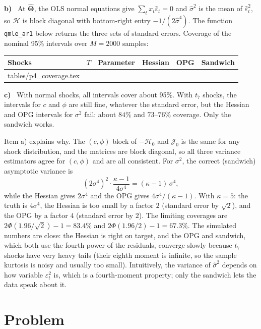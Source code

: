 \documentclass[11pt]{article}
\makeatletter
\newcommand{\symbf}[1]{\boldsymbol{#1}}
\newcounter{problem}
\renewcommand{\theproblem}{\arabic{problem}}
\newcommand{\problem}{
	\stepcounter{problem}
	\section*{Problem \theproblem}
}
\newcommand{\itm}[1]{\par\textbf{#1)}\ }
\newcommand{\tablerows}[1]{\@@input #1 }
\makeatother
\begin{document}
\itm{b}
At $\hat{\symbf\Theta}$, the OLS normal equations give $\sum_tx_t\hat\varepsilon_t=0$ and $\hat\sigma^2$ is the mean of $\hat\varepsilon_t^2$, so $\mathcal H$ is block diagonal with bottom-right entry $-1/(2\hat\sigma^4)$. The function \texttt{qmle\_ar1} below returns the three sets of standard errors. Coverage of the nominal 95\% intervals over $M=2000$ samples:

\begin{table}[H]
	\centering
	\begin{tabular}{llcccc}
		\toprule
		Shocks & $T$ & Parameter & Hessian & OPG & Sandwich \\
		\midrule
		\tablerows{tables/p4_coverage.tex}
		\bottomrule
	\end{tabular}
\end{table}

\itm{c}
With normal shocks, all intervals cover about 95\%. With $t_7$ shocks, the intervals for $c$ and $\phi$ are still fine, whatever the standard error, but the Hessian and OPG intervals for $\sigma^2$ fail: about $84\%$ and $73$--$76\%$ coverage. Only the sandwich works.

Item a) explains why. The $(c,\phi)$ block of $-\mathcal H_0$ and $\mathcal J_0$ is the same for any shock distribution, and the matrices are block diagonal, so all three variance estimators agree for $(c,\phi)$ and are all consistent. For $\sigma^2$, the correct (sandwich) asymptotic variance is
\[
\left(2\sigma^4\right)^2\cdot\frac{\kappa-1}{4\sigma^4}=(\kappa-1)\,\sigma^4,
\]
while the Hessian gives $2\sigma^4$ and the OPG gives $4\sigma^4/(\kappa-1)$. With $\kappa=5$: the truth is $4\sigma^4$, the Hessian is too small by a factor $2$ (standard error by $\sqrt2$), and the OPG by a factor $4$ (standard error by $2$). The limiting coverages are $2\Phi(1.96/\sqrt2)-1=83.4\%$ and $2\Phi(1.96/2)-1=67.3\%$. The simulated numbers are close: the Hessian is right on target, and the OPG and sandwich, which both use the fourth power of the residuals, converge slowly because $t_7$ shocks have very heavy tails (their eighth moment is infinite, so the sample kurtosis is noisy and usually too small). Intuitively, the variance of $\hat\sigma^2$ depends on how variable $\varepsilon_t^2$ is, which is a fourth-moment property; only the sandwich lets the data speak about it.



\problem
\end{document}
